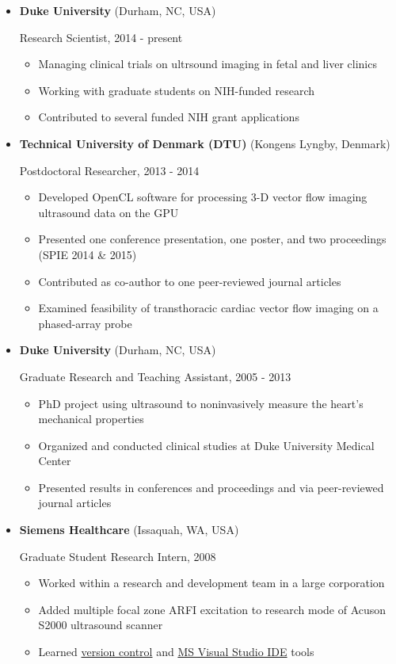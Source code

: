 \documentclass[
]{article}
\providecommand{\tightlist}{%
  \setlength{\itemsep}{0pt}\setlength{\parskip}{0pt}}
\begin{document}
\begin{itemize}
\item
  \textbf{Duke University} (Durham, NC, USA)

  Research Scientist, 2014 - present

  \begin{itemize}
  \tightlist
  \item
    Managing clinical trials on ultrsound imaging in fetal and liver
    clinics
  \item
    Working with graduate students on NIH-funded research
  \item
    Contributed to several funded NIH grant applications
  \end{itemize}
\item
  \textbf{Technical University of Denmark (DTU)} (Kongens Lyngby,
  Denmark)

  Postdoctoral Researcher, 2013 - 2014

  \begin{itemize}
  \tightlist
  \item
    Developed OpenCL software for processing 3-D vector flow imaging
    ultrasound data on the GPU
  \item
    Presented one conference presentation, one poster, and two
    proceedings (SPIE 2014 \& 2015)
  \item
    Contributed as co-author to one peer-reviewed journal articles
  \item
    Examined feasibility of transthoracic cardiac vector flow imaging on
    a phased-array probe
  \end{itemize}
\item
  \textbf{Duke University} (Durham, NC, USA)

  Graduate Research and Teaching Assistant, 2005 - 2013

  \begin{itemize}
  \tightlist
  \item
    PhD project using ultrasound to noninvasively measure the heart's
    mechanical properties
  \item
    Organized and conducted clinical studies at Duke University Medical
    Center
  \item
    Presented results in conferences and proceedings and via
    peer-reviewed journal articles
  \end{itemize}
\item
  \textbf{Siemens Healthcare} (Issaquah, WA, USA)

  Graduate Student Research Intern, 2008

  \begin{itemize}
  \tightlist
  \item
    Worked within a research and development team in a large corporation
  \item
    Added multiple focal zone ARFI excitation to research mode of Acuson
    S2000 ultrasound scanner
  \item
    Learned
    \href{http://www-03.ibm.com/software/products/en/clearcase}{version
    control} and \href{http://www.visualstudio.com/}{MS Visual Studio
    IDE} tools
  \end{itemize}
\end{itemize}
\end{document}
